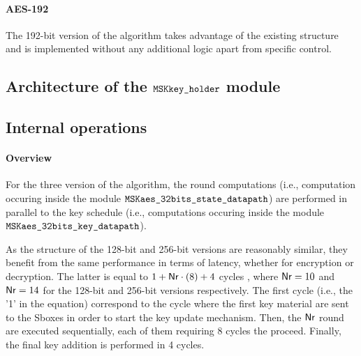 \documentclass{scrartcl}
\begin{document}
\paragraph{AES-192}
The 192-bit version of the algorithm takes advantage of the existing
structure and is implemented without any additional logic apart from specific
control.  


\subsection{Architecture of the $\texttt{MSKkey\_holder}$ module}

\subsection{Internal operations}

\paragraph{Overview}
For the three version of the algorithm, the round computations (i.e.,
computation occuring inside the module $\texttt{MSKaes\_32bits\_state\_datapath}$) are performed in
parallel to the key schedule (i.e., computations occuring inside the module
$\texttt{MSKaes\_32bits\_key\_datapath}$).

As the structure of the 128-bit and 256-bit versions are reasonably similar,
they benefit from the same performance in terms of latency, whether for
encryption or decryption.  The latter is equal to $1+\mathsf{Nr}\cdot(8)+4$ cycles ,
where $\mathsf{Nr} = 10$ and $\mathsf{Nr}= 14$ for the 128-bit and 256-bit versions
respectively. The first cycle (i.e., the '1' in the equation) correspond to the
cycle where the first key material are sent to the Sboxes in order to start the
key update mechanism. Then, the $\mathsf{Nr}$ round are executed sequentially, each of
them requiring 8 cycles the proceed.  Finally, the final key addition is
performed in 4 cycles. 
\end{document}
